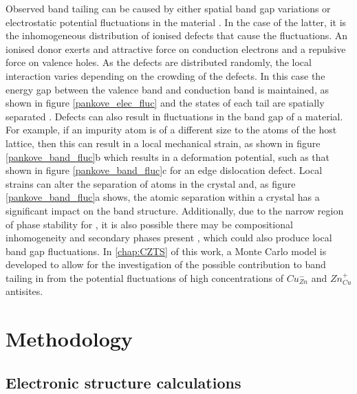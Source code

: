 \documentclass[11pt, twoside]{report}
\begin{document}
Observed band tailing can be caused by either spatial band gap variations or electrostatic potential fluctuations in the material \cite{band_tail}. In the case of the latter, it is the inhomogeneous distribution of ionised defects that cause the fluctuations. An ionised donor exerts and attractive force on conduction electrons and a repulsive force on valence holes. As the defects are distributed randomly, the local interaction varies depending on the crowding of the defects. In this case the energy gap between the valence band and conduction band is maintained, as shown in figure \ref{pankove_elec_fluc} and the states of each tail are spatially separated \cite{Pankove}. Defects can also result in fluctuations in the band gap of a material. For example, if an impurity atom is of a different size to the atoms of the host lattice, then this can result in a local mechanical strain, as shown in figure \ref{pankove_band_fluc}b which results in a deformation potential, such as that shown in figure \ref{pankove_band_fluc}c for an edge dislocation defect. Local strains can alter the separation of atoms in the crystal and, as figure \ref{pankove_band_fluc}a shows, the atomic separation within a crystal has a significant impact on the band structure. Additionally, due to the narrow region of phase stability for {\CZTS}, it is also possible there may be compositional inhomogeneity and secondary phases present \cite{SandS}, which could also produce local band gap fluctuations. 
In \autoref{chap:CZTS} of this work, a Monte Carlo model is developed to allow for the investigation of the possible contribution to band tailing in {\CZTS} from the potential fluctuations of high concentrations of $Cu_{Zn}^{-}$ and $Zn_{Cu}^{+}$ antisites. 


\chapter{Methodology}

\section{Electronic structure calculations}\label{elec_struc}
\end{document}
